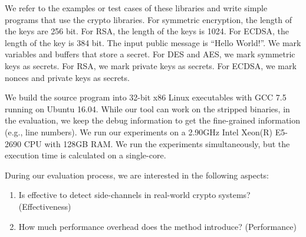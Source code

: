 We refer to the examples or test cases of these libraries and write simple
programs that use the crypto libraries. For symmetric encryption, the length
of the keys are 256 bit. For RSA, the length of the keys is 1024. For ECDSA, the
length of the key is 384 bit. The input public message is ``Hello World!''.
We mark variables and buffers that store a secret.
For DES and AES, we mark symmetric keys as secrets.
For RSA, we mark private keys as secrets. For ECDSA,
we mark nonces and private keys as secrets.

We build the source program into 32-bit x86 Linux executables with GCC 7.5
running on Ubuntu 16.04. While our tool can work on the stripped binaries, 
in the evaluation, we keep the debug information to get the fine-grained information
(e.g., line numbers).
We run our experiments on a 2.90GHz Intel Xeon(R) E5-2690 CPU with 128GB
RAM. We run the experiments simultaneously, but the execution time is calculated on a single-core.

During our evaluation process, we are interested in the following
aspects:
\begin{enumerate}
    \item Is \detect{} effective to detect side-channels in real-world crypto systems? (Effectiveness)
    \item How much performance overhead does the method introduce? (Performance)
\end{enumerate}

